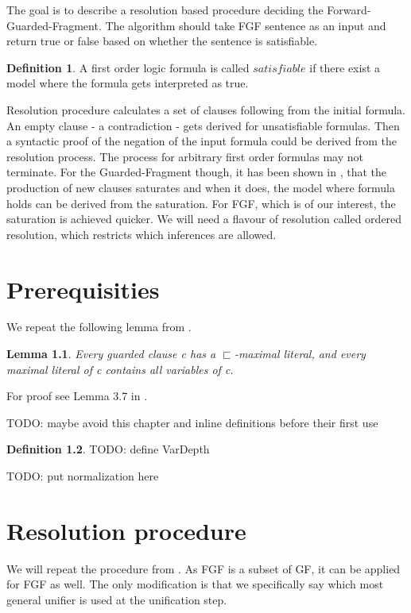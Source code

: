 \documentclass[english, shortabstract]{iithesis}
\theoremstyle{definition} \newtheorem{definition}{Definition}[chapter]
\theoremstyle{remark} \newtheorem{remark}[definition]{Observation}
\theoremstyle{plain} \newtheorem{theorem}[definition]{Theorem}
\theoremstyle{plain} \newtheorem{lemma}[definition]{Lemma}
\begin{document}
The goal is to describe a resolution based procedure deciding the Forward-Guarded-Fragment.
The algorithm should take FGF sentence as an input and return true or false based on whether the sentence is satisfiable.

\begin{definition}
A first order logic formula is called $satisfiable$ if there exist a model where the formula gets interpreted as true.
\end{definition}

Resolution procedure calculates a set of clauses following from the initial formula.
An empty clause - a contradiction - gets derived for unsatisfiable formulas. 
Then a syntactic proof of the negation of the input formula could be derived from the resolution process.
The process for arbitrary first order formulas may not terminate.
For the Guarded-Fragment though, it has been shown in \cite{resolution GF}, that the production of new clauses saturates
and when it does, the model where formula holds can be derived from the saturation.
For FGF, which is of our interest, the saturation is achieved quicker.
We will need a flavour of resolution called ordered resolution, which restricts which inferences are allowed.

\chapter{Prerequisities}
We repeat the following lemma from \cite{resolution GF}.
\begin{lemma}
Every guarded clause c has a $\sqsubset$-maximal literal, and every maximal literal
of c contains all variables of c.
\end{lemma}
For proof see Lemma 3.7 in \cite{resolution GF}.

TODO: maybe avoid this chapter and inline definitions before their first use
\begin{definition}
    TODO: define VarDepth
\end{definition}

TODO: put normalization here

\chapter{Resolution procedure}

We will repeat the procedure from \cite{resolution gf}. As FGF is a subset of GF, it can be applied for FGF as well.
The only modification is that we specifically say which most general unifier is used at the unification step.
\end{document}
